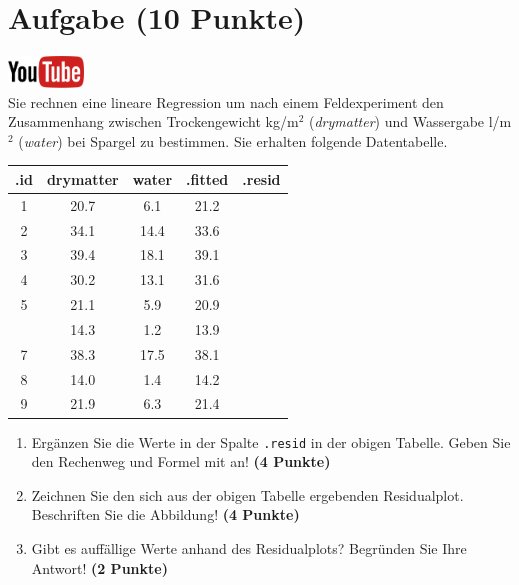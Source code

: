 \documentclass[a4paper, 9pt]{scrartcl}\usepackage[]{graphicx}\usepackage[]{xcolor}
\newenvironment{knitrout}{}{} %
\begin{document}
\section{Aufgabe \hfill (10 Punkte)}

\hfill\href{https://youtu.be/dyQlYV9nOqY}{\includegraphics[width =
  2cm]{img/youtube}}\\[1Ex]

Sie rechnen eine lineare Regression um nach einem Feldexperiment den
Zusammenhang zwischen Trockengewicht kg/m$^2$ (\textit{drymatter}) und
Wassergabe l/m$^2$ (\textit{water}) bei Spargel zu bestimmen. Sie erhalten
folgende Datentabelle.

\begin{knitrout}
\color{fgcolor}\begin{table}[!h]
\centering\begingroup\fontsize{12}{14}\selectfont

\begin{tabular}{ccccc}
\toprule
.id & drymatter & water & .fitted & .resid\\
\midrule
1 & 20.7 & 6.1 & 21.2 & \\
2 & 34.1 & 14.4 & 33.6 & \\
3 & 39.4 & 18.1 & 39.1 & \\
4 & 30.2 & 13.1 & 31.6 & \\
5 & 21.1 & 5.9 & 20.9 & \\
\addlinespace
6 & 14.3 & 1.2 & 13.9 & \\
7 & 38.3 & 17.5 & 38.1 & \\
8 & 14.0 & 1.4 & 14.2 & \\
9 & 21.9 & 6.3 & 21.4 & \\
\bottomrule
\end{tabular}
\endgroup{}
\end{table}

\end{knitrout}

\begin{enumerate}
\item Erg{\"a}nzen Sie die Werte in der Spalte \texttt{.resid} in der obigen
  Tabelle. Geben Sie den Rechenweg und Formel mit an! \textbf{(4 Punkte)}
\item Zeichnen Sie den sich aus der obigen Tabelle ergebenden
  Residualplot. Beschriften Sie die Abbildung! \textbf{(4 Punkte)}
\item Gibt es auff{\"a}llige Werte anhand des Residualplots? Begr{\"u}nden Sie Ihre
  Antwort! \textbf{(2 Punkte)}
\end{enumerate}
 
\end{document}
